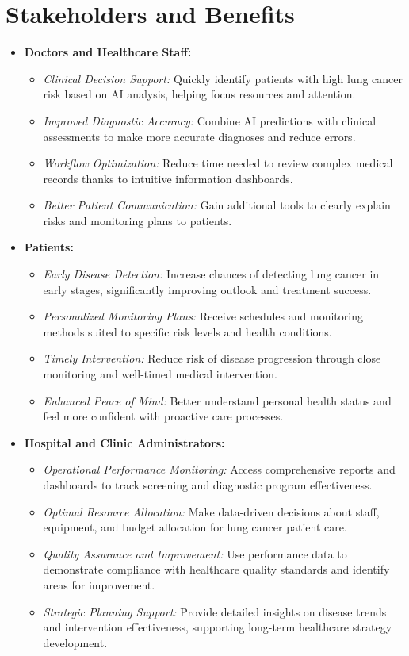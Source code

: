 \section{Stakeholders and Benefits}
\begin{itemize}
    \item \textbf{Doctors and Healthcare Staff:}
    \begin{itemize}
        \item \textit{Clinical Decision Support:} Quickly identify patients with high lung cancer risk based on AI analysis, helping focus resources and attention.
        \item \textit{Improved Diagnostic Accuracy:} Combine AI predictions with clinical assessments to make more accurate diagnoses and reduce errors.
        \item \textit{Workflow Optimization:} Reduce time needed to review complex medical records thanks to intuitive information dashboards.
        \item \textit{Better Patient Communication:} Gain additional tools to clearly explain risks and monitoring plans to patients.
    \end{itemize}
    
    \item \textbf{Patients:}
    \begin{itemize}
        \item \textit{Early Disease Detection:} Increase chances of detecting lung cancer in early stages, significantly improving outlook and treatment success.
        \item \textit{Personalized Monitoring Plans:} Receive schedules and monitoring methods suited to specific risk levels and health conditions.
        \item \textit{Timely Intervention:} Reduce risk of disease progression through close monitoring and well-timed medical intervention.
        \item \textit{Enhanced Peace of Mind:} Better understand personal health status and feel more confident with proactive care processes.
    \end{itemize}

    \item \textbf{Hospital and Clinic Administrators:}
    \begin{itemize}
        \item \textit{Operational Performance Monitoring:} Access comprehensive reports and dashboards to track screening and diagnostic program effectiveness.
        \item \textit{Optimal Resource Allocation:} Make data-driven decisions about staff, equipment, and budget allocation for lung cancer patient care.
        \item \textit{Quality Assurance and Improvement:} Use performance data to demonstrate compliance with healthcare quality standards and identify areas for improvement.
        \item \textit{Strategic Planning Support:} Provide detailed insights on disease trends and intervention effectiveness, supporting long-term healthcare strategy development.
    \end{itemize}


\end{itemize}
